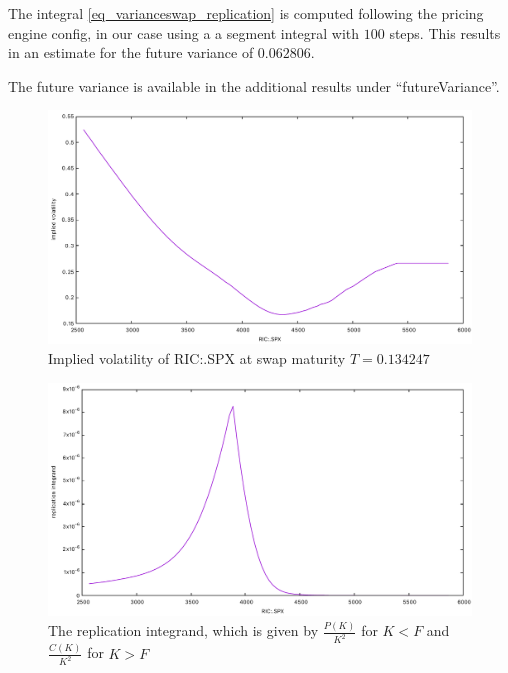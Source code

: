 The integral \ref{eq_varianceswap_replication} is computed following the pricing engine config, in our case using a a
segment integral with $100$ steps. This results in an estimate for the future variance of $0.062806$.

The future variance is available in the additional results under ``futureVariance''.

\begin{figure}[ht]
\begin{center}
\includegraphics[scale=0.6]{pricing/eq_varianceswap_fig1.pdf}
\end{center}
\caption{Implied volatility of RIC:.SPX at swap maturity $T=0.134247$}
\label{eq_var_swap_fig1}
\end{figure}

\begin{figure}[ht]
\begin{center}
\includegraphics[scale=0.6]{pricing/eq_varianceswap_fig2.pdf}
\end{center}
\caption{The replication integrand, which is given by $\frac{P(K)}{K^2}$ for $K < F$ and $\frac{C(K)}{K^2}$ for $K > F$}
\label{eq_var_swap_fig2}
\end{figure}

